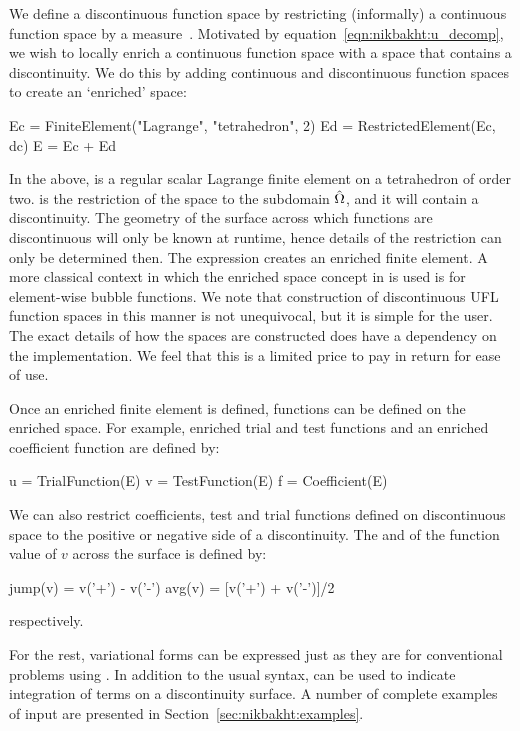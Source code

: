 We define a discontinuous function space by restricting (informally)
a continuous function space by a measure~. Motivated by
equation~\eqref{eqn:nikbakht:u_decomp}, we wish to locally enrich a
continuous function space with a space that contains a discontinuity. We
do this by adding continuous and discontinuous function spaces to create
an `enriched' space:
%
\begin{python}
Ec = FiniteElement("Lagrange", "tetrahedron", 2)
Ed = RestrictedElement(Ec, dc)
E  = Ec + Ed
\end{python}
%
In the above,  is a regular scalar Lagrange finite element
on a tetrahedron of order two.  is the restriction of the
space  to the subdomain $\Hat{\Omega}$, and it will contain
a discontinuity. The geometry of the surface across which functions
are discontinuous will only be known at runtime, hence details of the
restriction can only be determined then. The expression  creates an enriched finite element. A more classical context in
which the enriched space concept in \ufl{} is used is for element-wise
bubble functions.  We note that construction of discontinuous UFL function
spaces in this manner is not unequivocal, but it is simple for the user.
The exact details of how the spaces are constructed does have a dependency
on the implementation. We feel that this is a limited price to pay in
return for ease of use.

Once an enriched finite element is defined, functions can be defined on
the enriched space. For example, enriched trial and test functions and
an enriched coefficient function are defined by:
%
\begin{python}
u = TrialFunction(E)
v = TestFunction(E)
f = Coefficient(E)
\end{python}
%
We can also restrict coefficients, test and trial functions
defined on discontinuous space to the positive or negative side of a
discontinuity. The  and  of the function value
of $v$ across the surface is defined by:
%
\begin{python}
jump(v) = v('+') - v('-')
avg(v)  = [v('+') + v('-')]/2
\end{python}
%
respectively.

For the rest, variational forms can be expressed just as they are for
conventional problems using \ufl{}. In addition to the usual \ufl{}
syntax,  can be used to indicate integration of terms on a
discontinuity surface.  A number of complete examples of \ufl{} input
are presented in Section~\ref{sec:nikbakht:examples}.
